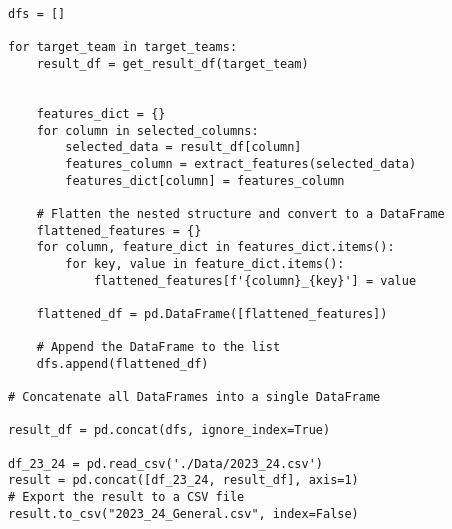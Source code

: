 \begin{lstlisting}[style=pystyle]
dfs = []

for target_team in target_teams:
    result_df = get_result_df(target_team)


    features_dict = {}
    for column in selected_columns:
        selected_data = result_df[column]
        features_column = extract_features(selected_data)
        features_dict[column] = features_column

    # Flatten the nested structure and convert to a DataFrame
    flattened_features = {}
    for column, feature_dict in features_dict.items():
        for key, value in feature_dict.items():
            flattened_features[f'{column}_{key}'] = value

    flattened_df = pd.DataFrame([flattened_features])

    # Append the DataFrame to the list
    dfs.append(flattened_df)

# Concatenate all DataFrames into a single DataFrame

result_df = pd.concat(dfs, ignore_index=True)

df_23_24 = pd.read_csv('./Data/2023_24.csv')
result = pd.concat([df_23_24, result_df], axis=1)
# Export the result to a CSV file
result.to_csv("2023_24_General.csv", index=False)
\end{lstlisting}
% 
% 
% 
% 
% 
% 
% 
% 
% 
% 
% 
% 
% 
% 
% 
% 
% 
% 
